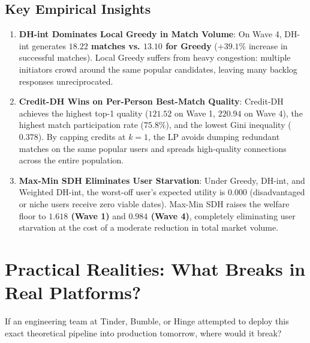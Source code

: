 \documentclass[11pt,letterpaper]{article}
\theoremstyle{definition}
\theoremstyle{plain}
\theoremstyle{remark}
\begin{document}
\subsection{Key Empirical Insights}
\begin{enumerate}[leftmargin=2em]
    \item \textbf{DH-int Dominates Local Greedy in Match Volume}:
    On Wave 4, DH-int generates \textbf{$18.22$ matches vs. $13.10$ for Greedy} ($+39.1\%$ increase in successful matches). Local Greedy suffers from heavy congestion: multiple initiators crowd around the same popular candidates, leaving many backlog responses unreciprocated.
    \item \textbf{Credit-DH Wins on Per-Person Best-Match Quality}:
    Credit-DH achieves the highest top-1 quality ($121.52$ on Wave 1, $220.94$ on Wave 4), the highest match participation rate ($75.8\%$), and the lowest Gini inequality ($0.378$). By capping credits at $k=1$, the LP avoids dumping redundant matches on the same popular users and spreads high-quality connections across the entire population.
    \item \textbf{Max-Min SDH Eliminates User Starvation}:
    Under Greedy, DH-int, and Weighted DH-int, the worst-off user's expected utility is \textbf{$0.000$} (disadvantaged or niche users receive zero viable dates). Max-Min SDH raises the welfare floor to \textbf{$1.618$ (Wave 1)} and \textbf{$0.984$ (Wave 4)}, completely eliminating user starvation at the cost of a moderate reduction in total market volume.
\end{enumerate}

\newpage
\section{Practical Realities: What Breaks in Real Platforms?}
\label{sec:real_world}

If an engineering team at Tinder, Bumble, or Hinge attempted to deploy this exact theoretical pipeline into production tomorrow, where would it break?
\end{document}
